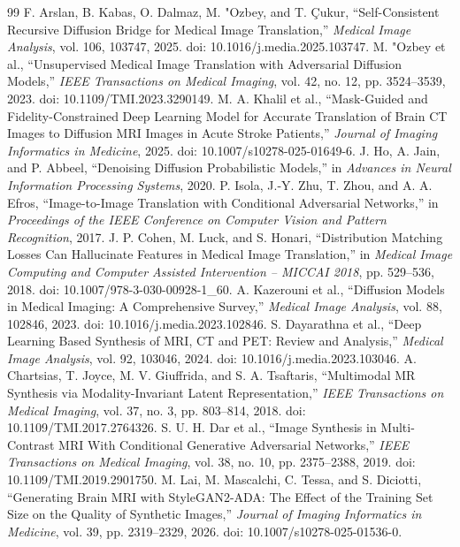 \begin{thebibliography}{99}
 F. Arslan, B. Kabas, O. Dalmaz, M. "Ozbey, and T. \c{C}ukur, ``Self-Consistent Recursive Diffusion Bridge for Medical Image Translation,'' \textit{Medical Image Analysis}, vol. 106, 103747, 2025. doi: 10.1016/j.media.2025.103747.
 M. "Ozbey et al., ``Unsupervised Medical Image Translation with Adversarial Diffusion Models,'' \textit{IEEE Transactions on Medical Imaging}, vol. 42, no. 12, pp. 3524--3539, 2023. doi: 10.1109/TMI.2023.3290149.
 M. A. Khalil et al., ``Mask-Guided and Fidelity-Constrained Deep Learning Model for Accurate Translation of Brain CT Images to Diffusion MRI Images in Acute Stroke Patients,'' \textit{Journal of Imaging Informatics in Medicine}, 2025. doi: 10.1007/s10278-025-01649-6.
 J. Ho, A. Jain, and P. Abbeel, ``Denoising Diffusion Probabilistic Models,'' in \textit{Advances in Neural Information Processing Systems}, 2020.
 P. Isola, J.-Y. Zhu, T. Zhou, and A. A. Efros, ``Image-to-Image Translation with Conditional Adversarial Networks,'' in \textit{Proceedings of the IEEE Conference on Computer Vision and Pattern Recognition}, 2017.
 J. P. Cohen, M. Luck, and S. Honari, ``Distribution Matching Losses Can Hallucinate Features in Medical Image Translation,'' in \textit{Medical Image Computing and Computer Assisted Intervention -- MICCAI 2018}, pp. 529--536, 2018. doi: 10.1007/978-3-030-00928-1\_60.
 A. Kazerouni et al., ``Diffusion Models in Medical Imaging: A Comprehensive Survey,'' \textit{Medical Image Analysis}, vol. 88, 102846, 2023. doi: 10.1016/j.media.2023.102846.
 S. Dayarathna et al., ``Deep Learning Based Synthesis of MRI, CT and PET: Review and Analysis,'' \textit{Medical Image Analysis}, vol. 92, 103046, 2024. doi: 10.1016/j.media.2023.103046.
 A. Chartsias, T. Joyce, M. V. Giuffrida, and S. A. Tsaftaris, ``Multimodal MR Synthesis via Modality-Invariant Latent Representation,'' \textit{IEEE Transactions on Medical Imaging}, vol. 37, no. 3, pp. 803--814, 2018. doi: 10.1109/TMI.2017.2764326.
 S. U. H. Dar et al., ``Image Synthesis in Multi-Contrast MRI With Conditional Generative Adversarial Networks,'' \textit{IEEE Transactions on Medical Imaging}, vol. 38, no. 10, pp. 2375--2388, 2019. doi: 10.1109/TMI.2019.2901750.
 M. Lai, M. Mascalchi, C. Tessa, and S. Diciotti, ``Generating Brain MRI with StyleGAN2-ADA: The Effect of the Training Set Size on the Quality of Synthetic Images,'' \textit{Journal of Imaging Informatics in Medicine}, vol. 39, pp. 2319--2329, 2026. doi: 10.1007/s10278-025-01536-0.
\end{thebibliography}
